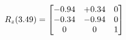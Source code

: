 \documentclass[preview]{standalone}
\begin{document}
\begin{align*}
\special{dvisvgm:raw <g id='unique000'>}R_{z}(3.49) = \begin{bmatrix}-0.94 & +0.34 & 0 \\-0.34 & -0.94 & 0 \\0 & 0 & 1\end{bmatrix}\special{dvisvgm:raw </g>}
\end{align*}
\end{document}
